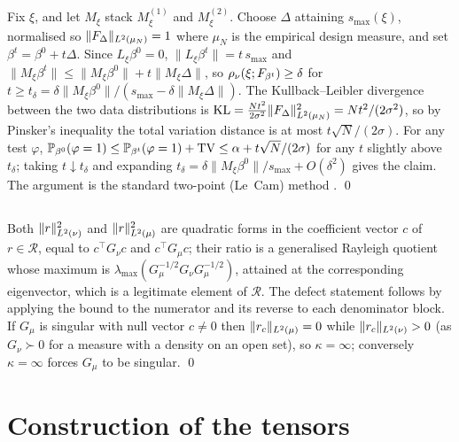 \subsection*{}
Fix $\xi$, and let $M_\xi$ stack $M^{(1)}_\xi$ and $M^{(2)}_\xi$. Choose
$\Delta$ attaining $s_{\max}(\xi)$, normalised so
$\|F_\Delta\|_{L^2(\mu_N)} = 1$ where $\mu_N$ is the empirical design measure,
and set $\beta^t = \beta^0 + t\Delta$. Since $L_\xi \beta^0 = 0$,
$\|L_\xi\beta^t\| = t\,s_{\max}$ and
$\|M_\xi \beta^t\| \le \|M_\xi\beta^0\| + t\|M_\xi\Delta\|$, so
$\rho_\nu(\xi;F_{\beta^t}) \ge \delta$ for
$t \ge t_\delta = \delta\|M_\xi\beta^0\|/(s_{\max}-\delta\|M_\xi\Delta\|)$.
The Kullback--Leibler divergence between the two data distributions is
$\mathrm{KL} = \tfrac{N t^2}{2\sigma^2}\|F_\Delta\|^2_{L^2(\mu_N)}
= Nt^2/(2\sigma^2)$, so by Pinsker's inequality the total variation distance is
at most $t\sqrt N/(2\sigma)$. For any test $\varphi$,
$\mathbb{P}_{\beta^0}(\varphi=1) \le \mathbb{P}_{\beta^{t}}(\varphi=1) +
\mathrm{TV} \le \alpha + t\sqrt N/(2\sigma)$ for any $t$ slightly above
$t_\delta$; taking $t \downarrow t_\delta$ and expanding
$t_\delta = \delta\|M_\xi\beta^0\|/s_{\max} + O(\delta^2)$ gives the claim.
The argument is the standard two-point (Le~Cam) method
\citep[Ch.~2]{tsybakov2009introduction}. \qed

\subsection*{}
Both $\|r\|^2_{L^2(\nu)}$ and $\|r\|^2_{L^2(\mu)}$ are quadratic forms in
the coefficient vector $c$ of $r \in \mathcal R$, equal to $c^{\!\top}G_\nu c$
and $c^{\!\top}G_\mu c$; their ratio is a generalised Rayleigh quotient whose
maximum is $\lambda_{\max}(G_\mu^{-1/2}G_\nu G_\mu^{-1/2})$, attained at the
corresponding eigenvector, which is a legitimate element of $\mathcal R$. The
defect statement follows by applying the bound to the numerator and its reverse
to each denominator block. If $G_\mu$ is singular with null vector $c \ne 0$
then $\|r_c\|_{L^2(\mu)} = 0$ while $\|r_c\|_{L^2(\nu)}>0$ (as $G_\nu \succ
0$ for a measure with a density on an open set), so $\kappa = \infty$;
conversely $\kappa = \infty$ forces $G_\mu$ to be singular. \qed

\section{Construction of the tensors}
\label{app:construction}

